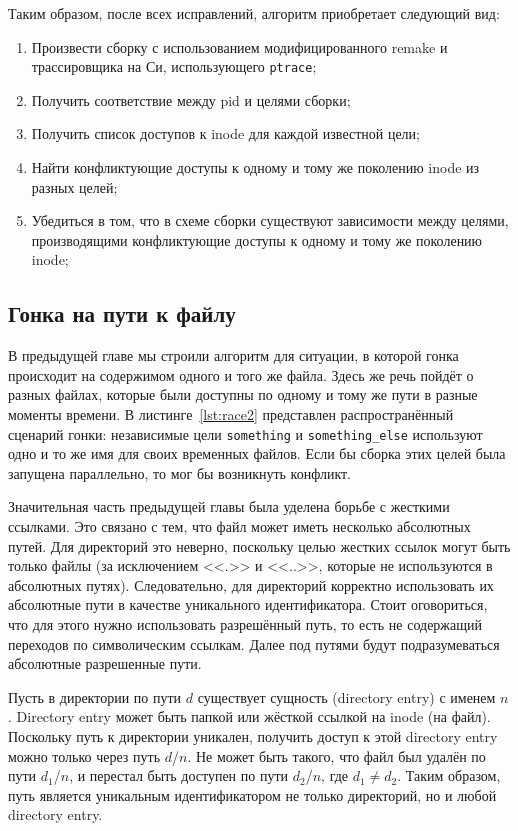 Таким образом, после всех исправлений, алгоритм приобретает следующий вид:

\begin{enumerate}
	\item Произвести сборку с использованием модифицированного remake и трассировщика на Си, использующего \texttt{ptrace};
	\item Получить соответствие между pid и целями сборки;
	\item Получить список доступов к inode для каждой известной цели;
	\item Найти конфликтующие доступы к одному и тому же поколению inode из разных целей;
	\item Убедиться в том, что в схеме сборки существуют зависимости между целями, производящими конфликтующие доступы к одному и тому же поколению inode;
\end{enumerate}

\subsection{Гонка на пути к файлу}
\label{subsec:path-race}



В предыдущей главе мы строили алгоритм для ситуации, в которой гонка происходит на содержимом одного и того же файла. Здесь же речь пойдёт о разных файлах, которые были доступны по одному и тому же пути в разные моменты времени. В листинге~\ref{lst:race2} представлен распространённый сценарий гонки: независимые цели \texttt{something} и \texttt{something\_else} используют одно и то же имя для своих временных файлов. Если бы сборка этих целей была запущена параллельно, то мог бы возникнуть конфликт.

Значительная часть предыдущей главы была уделена борьбе с жесткими ссылками. Это связано с тем, что файл может иметь несколько абсолютных путей. Для директорий это неверно, поскольку целью жестких ссылок могут быть только файлы (за исключением <<.>> и <<..>>, которые не используются в абсолютных путях). Следовательно, для директорий корректно использовать их абсолютные пути в качестве уникального идентификатора. Стоит оговориться, что для этого нужно использовать разрешённый путь, то есть не содержащий переходов по символическим ссылкам. Далее под путями будут подразумеваться абсолютные разрешенные пути.

Пусть в директории по пути $d$ существует сущность (directory entry) с именем $n$. Directory entry может быть папкой или жёсткой ссылкой на inode (на файл). Поскольку путь к директории уникален, получить доступ к этой directory entry можно только через путь $d$/$n$. Не может быть такого, что файл был удалён по пути $d_1$/$n$, и перестал быть доступен по пути $d_2$/$n$, где $d_1 \ne d_2$. Таким образом, путь является уникальным идентификатором не только директорий, но и любой directory entry.

